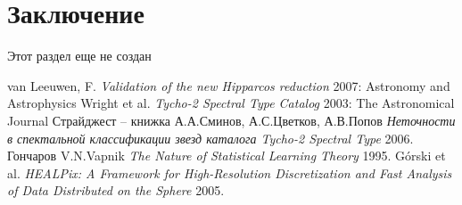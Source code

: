 \documentclass[14pt]{article}
\begin{document}
	\section{Заключение} 
	      
	    Этот раздел еще не создан
	      
        
    \begin{thebibliography}{1}
         van Leeuwen, F. {\em Validation of the new Hipparcos reduction}  2007: Astronomy and Astrophysics
         Wright et al. {\em Tycho-2 Spectral Type Catalog} 2003: The Astronomical Journal
         Страйджест – книжка
         А.А.Сминов, А.С.Цветков, А.В.Попов {\em Неточности в спектальной классификации звезд каталога Tycho-2 Spectral Type} 2006.
         Гончаров 
         V.N.Vapnik {\em The Nature of Statistical Learning Theory} 1995.
         Górski et al. {\em HEALPix: A Framework for High-Resolution Discretization and Fast Analysis of Data Distributed on the Sphere} 2005.
    \end{thebibliography}    
\end{document}
